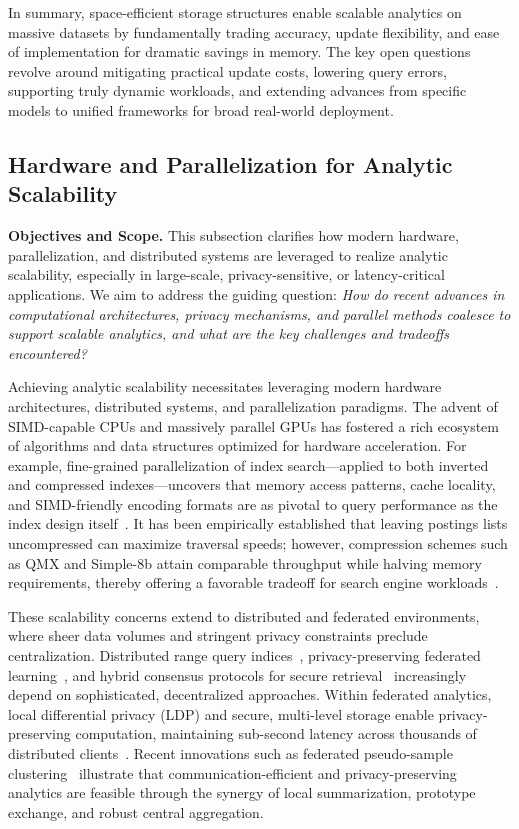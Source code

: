 \documentclass[sigconf]{acmart}
\begin{document}
In summary, space-efficient storage structures enable scalable analytics on massive datasets by fundamentally trading accuracy, update flexibility, and ease of implementation for dramatic savings in memory. The key open questions revolve around mitigating practical update costs, lowering query errors, supporting truly dynamic workloads, and extending advances from specific models to unified frameworks for broad real-world deployment.

\subsection{Hardware and Parallelization for Analytic Scalability}

\textbf{Objectives and Scope.} This subsection clarifies how modern hardware, parallelization, and distributed systems are leveraged to realize analytic scalability, especially in large-scale, privacy-sensitive, or latency-critical applications. We aim to address the guiding question: \textit{How do recent advances in computational architectures, privacy mechanisms, and parallel methods coalesce to support scalable analytics, and what are the key challenges and tradeoffs encountered?}

Achieving analytic scalability necessitates leveraging modern hardware architectures, distributed systems, and parallelization paradigms. The advent of SIMD-capable CPUs and massively parallel GPUs has fostered a rich ecosystem of algorithms and data structures optimized for hardware acceleration. For example, fine-grained parallelization of index search—applied to both inverted and compressed indexes—uncovers that memory access patterns, cache locality, and SIMD-friendly encoding formats are as pivotal to query performance as the index design itself~\cite{ref16,ref18,ref32,ref49,ref94,ref96}. It has been empirically established that leaving postings lists uncompressed can maximize traversal speeds; however, compression schemes such as QMX and Simple-8b attain comparable throughput while halving memory requirements, thereby offering a favorable tradeoff for search engine workloads~\cite{ref94}.

These scalability concerns extend to distributed and federated environments, where sheer data volumes and stringent privacy constraints preclude centralization. Distributed range query indices~\cite{ref39}, privacy-preserving federated learning~\cite{ref15,ref19}, and hybrid consensus protocols for secure retrieval~\cite{ref17} increasingly depend on sophisticated, decentralized approaches. Within federated analytics, local differential privacy (LDP) and secure, multi-level storage enable privacy-preserving computation, maintaining sub-second latency across thousands of distributed clients~\cite{ref19}. Recent innovations such as federated pseudo-sample clustering~\cite{ref20} illustrate that communication-efficient and privacy-preserving analytics are feasible through the synergy of local summarization, prototype exchange, and robust central aggregation.
\end{document}
